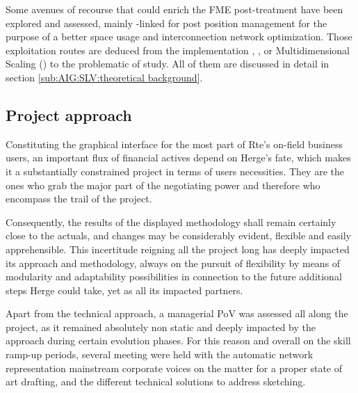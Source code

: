 
Some avenues of recourse that could enrich the FME post-treatment have been explored and assessed, mainly -linked for post position management for the purpose of a better space usage and interconnection network optimization. Those exploitation routes are deduced from the implementation , ,  or Multidimensional Scaling () to the problematic of study. All of them are discussed in detail in section \ref{sub:AIG:SLV:theoretical background}.


\subsection{Project approach}
\label{sec:introduction:thesis-purpose:project-approach}

Constituting the graphical interface for the most part of Rte's on-field business users, an important flux of financial actives depend on Herge's fate, which makes it a substantially constrained project in terms of users necessities. They are the ones who grab the major part of the negotiating power and therefore who encompass the trail of the project.

Consequently, the results of the displayed methodology shall remain certainly close to the actuals, and changes may be considerably evident, flexible and easily apprehensible. This incertitude reigning all the project long has deeply impacted its approach and methodology, always on the pursuit of flexibility by means of modularity and adaptability possibilities in connection to the future additional steps Herge could take, yet as all its impacted partners.

Apart from the technical approach, a managerial PoV was assessed all along the project, as it remained absolutely non static and deeply impacted by the approach during certain evolution phases. For this reason and overall on the skill ramp-up periods, several meeting were held with the automatic network representation mainstream corporate voices on the matter for a proper state of art drafting, and the different technical solutions to address sketching.

